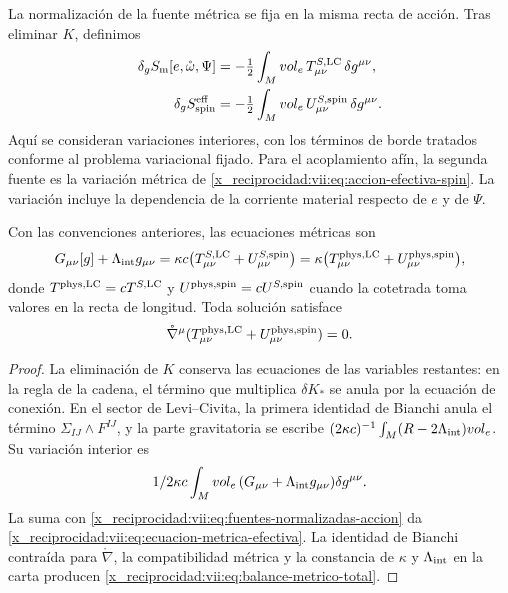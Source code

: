 \begin{HMTCompactSection}
La normalización de la fuente métrica se fija en la misma recta de
acción. Tras eliminar \(K\), definimos
\begin{align}
 \delta_g S_{\rm m}[e,\mathring\omega,\Psi]
 &=-\tfrac12\int_M\operatorname{vol}_e\,
                   \mathcal T^{S,\rm LC}_{\mu\nu}\,\delta g^{\mu\nu},
 \\
 \delta_g S_{\rm spin}^{\rm eff}
 &=-\tfrac12\int_M\operatorname{vol}_e\,
                   \mathcal U^{S,\rm spin}_{\mu\nu}\,\delta g^{\mu\nu}.
 \label{x_reciprocidad:vii:eq:fuentes-normalizadas-accion}
\end{align}
Aquí se consideran variaciones interiores, con los términos de borde
tratados conforme al problema variacional fijado. Para el acoplamiento
afín, la segunda fuente es la variación métrica de
\eqref{x_reciprocidad:vii:eq:accion-efectiva-spin}. La variación incluye la dependencia
de la corriente material respecto de \(e\) y de \(\Psi\).

\begin{proposition}
\label{x_reciprocidad:vii:prop:fuente-metrica-balance}
Con las convenciones anteriores, las ecuaciones métricas son
\begin{equation}
 G_{\mu\nu}[g]+\Lambda_{\rm int}g_{\mu\nu}
 =\kappa c\bigl(\mathcal T^{S,\rm LC}_{\mu\nu}
                    +\mathcal U^{S,\rm spin}_{\mu\nu}\bigr)
 =\kappa\bigl(T^{\rm phys,LC}_{\mu\nu}
                    +U^{\rm phys,spin}_{\mu\nu}\bigr),
 \label{x_reciprocidad:vii:eq:ecuacion-metrica-efectiva}
\end{equation}
donde \(T^{\rm phys,LC}=c\mathcal T^{S,\rm LC}\) y
\(U^{\rm phys,spin}=c\mathcal U^{S,\rm spin}\) cuando la
cotetrada toma valores en la recta de longitud. Toda solución satisface
\begin{equation}
 \mathring\nabla^\mu
   (T^{\rm phys,LC}_{\mu\nu}+U^{\rm phys,spin}_{\mu\nu})=0.
 \label{x_reciprocidad:vii:eq:balance-metrico-total}
\end{equation}
\end{proposition}
\begin{proof}
La eliminación de \(K\) conserva las ecuaciones de las variables
restantes: en la regla de la cadena, el término que multiplica
\(\delta K_*\) se anula por la ecuación de conexión. En el sector
de Levi--Civita, la primera identidad de Bianchi anula el término
\(\Sigma_{IJ}\wedge F^{IJ}\), y la parte gravitatoria se escribe
\((2\kappa c)^{-1}\int_M(R-2\Lambda_{\rm int})\operatorname{vol}_e\).
Su variación interior es
\[
 \frac1{2\kappa c}\int_M\operatorname{vol}_e\,
        (G_{\mu\nu}+\Lambda_{\rm int}g_{\mu\nu})\delta g^{\mu\nu}.
\]
La suma con \eqref{x_reciprocidad:vii:eq:fuentes-normalizadas-accion} da
\eqref{x_reciprocidad:vii:eq:ecuacion-metrica-efectiva}. La identidad de Bianchi
contraída para \(\mathring\nabla\), la compatibilidad métrica y
la constancia de \(\kappa\) y \(\Lambda_{\rm int}\) en la carta
producen \eqref{x_reciprocidad:vii:eq:balance-metrico-total}.
\end{proof}


\end{HMTCompactSection}
